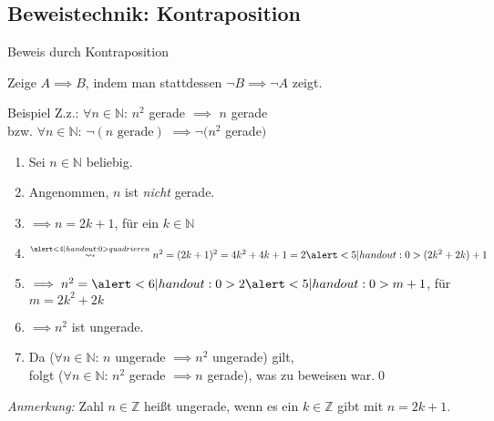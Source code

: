 \subsection{Beweistechnik: Kontraposition}
\begin{frame}[fragile]{Beweis durch Kontraposition}
	\begin{alertblock}{Zeige $A\implies B$, indem man stattdessen $\neg B \implies\neg A$ zeigt.}
	\end{alertblock}
	\begin{exampleblock}{Beispiel}
		Z.z.: \alert<7|handout:0>{\alert<1|handout:0>{$\forall n\in\mathbb{N}$:} $n^2$ gerade $\implies$\alert<2|handout:0>{ $n$ gerade}} \\
		\qquad bzw. \alert<1|handout:0>{$\forall n\in\mathbb{N}$:} \alert<2|handout:0>{$\neg(n \text{ gerade})$} $\implies \neg(n^2$ gerade$)$
		\begin{enumerate}
			\item\alert<1|handout:0>{Sei $n \in \mathbb{N}$ beliebig.}
			\item\alert<2|handout:0>{Angenommen, $n$ ist \emph{nicht} gerade.}
			\item\alert<3|handout:0>{$\implies n=2k+1$, für ein $k \in \mathbb{N}$}
			\item $\overset{\alert<4|handout:0>{quadrieren}}{\; \leadsto \;} n^2 = (2k+1)^2 = 4k^2+4k+1 = 2\alert<5|handout:0>{(2k^2+2k)}+1$
			\item $\implies n^2= \alert<6|handout:0>{2\alert<5|handout:0>{m}+1}$, für $m=2k^2+2k$
			\item $\implies n^2$ ist \alert<6|handout:0>{ungerade}.
			\item Da ($\forall n\in\mathbb{N}$: $n$ ungerade $\implies n^2$ ungerade) gilt, \\
			      folgt \alert<7|handout:0>{($\forall n\in\mathbb{N}$: $n^2$ gerade $\implies n$ gerade)}, was zu beweisen war.\qed\;
		\end{enumerate}
	\end{exampleblock}
	\footnotesize{\alert<3,6|handout:0>{\emph{Anmerkung:}} Zahl $n\in\mathbb{Z}$ heißt ungerade, wenn es ein $k\in\mathbb{Z}$ gibt mit $n=2k+1$.}
\end{frame}

